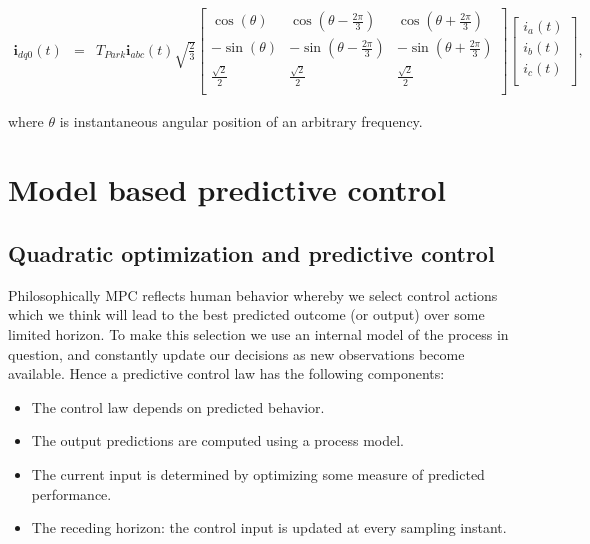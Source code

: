 \begin{equation}
        \begin{array}{rcl}
            \textbf{i}_{dq0}(t)&=&T_{Park}\textbf{i}_{abc}(t)
            \sqrt{\frac{2}{3}}\begin{bmatrix}
            \cos(\theta)& \cos(\theta-\frac{2\pi}{3})& \cos(\theta+\frac{2\pi}{3})\\
            -\sin(\theta)& -\sin(\theta-\frac{2\pi}{3})& -\sin(\theta+\frac{2\pi}{3})\\
            \frac{\sqrt{2}}{2}& \frac{\sqrt{2}}{2}& \frac{\sqrt{2}}{2}\\
            \end{bmatrix}
            \begin{bmatrix}
            i_a(t)\\
            i_b(t)\\
            i_c(t)\\
            \end{bmatrix},
        \end{array}
        \label{BASICCSR:eqn:Park}
    \end{equation}

    where $\theta$ is instantaneous angular position of an arbitrary frequency.

\section{Model based predictive control}

\subsection{Quadratic optimization and predictive control}\label{BASICCSR:sec:MPC}

Philosophically MPC reflects human behavior whereby we select control actions which we think will lead to the best predicted outcome (or output) over some limited horizon. To make this selection we use an internal model of the process in question, and constantly update our decisions as new observations become available. Hence a predictive control law has the following components:
\begin{itemize}
\item The control law depends on predicted behavior.
\item The output predictions are computed using a process model.
\item The current input is determined by optimizing some measure of predicted performance.
\item The receding horizon: the control input is updated at every sampling instant.
\end{itemize}

